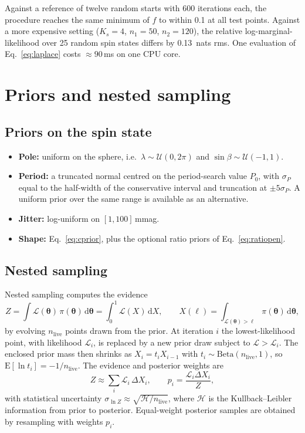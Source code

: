 \documentclass[11pt,a4paper]{article}
\theoremstyle{remark}
\newcommand{\vect}[1]{\bm{#1}}
\newcommand{\dd}{\,\mathrm{d}}
\begin{document}
Against a reference of twelve random starts with 600 iterations each, the procedure reaches the same
minimum of $f$ to within 0.1 at all test points. Against a more expensive setting ($K_s=4$, $n_1=50$,
$n_2=120$), the relative log-marginal-likelihood over 25 random spin states differs by 0.13~nats rms.
One evaluation of Eq.~\eqref{eq:laplace} costs $\approx90$\,ms on one CPU core.

\section{Priors and nested sampling}
\label{sec:nested}

\subsection{Priors on the spin state}
\label{sec:priors}
\begin{itemize}[nosep]
\item \textbf{Pole:} uniform on the sphere, i.e.\ $\lambda\sim\mathcal U(0,2\pi)$ and
  $\sin\beta\sim\mathcal U(-1,1)$.
\item \textbf{Period:} a truncated normal centred on the period-search value $P_0$, with $\sigma_P$
  equal to the half-width of the conservative interval and truncation at $\pm5\sigma_P$. A uniform
  prior over the same range is available as an alternative.
\item \textbf{Jitter:} log-uniform on $[1,100]$\,mmag.
\item \textbf{Shape:} Eq.~\eqref{eq:cprior}, plus the optional ratio priors of Eq.~\eqref{eq:ratiopen}.
\end{itemize}

\subsection{Nested sampling}
Nested sampling \citep{skilling2006} computes the evidence
\begin{equation}
  Z=\int\mathcal L(\vect\theta)\,\pi(\vect\theta)\dd\vect\theta=\int_0^1\mathcal L(X)\dd X,\qquad
  X(\ell)=\int_{\mathcal L(\vect\theta)>\ell}\pi(\vect\theta)\dd\vect\theta,
\end{equation}
by evolving $n_{\mathrm{live}}$ points drawn from the prior. At iteration $i$ the lowest-likelihood
point, with likelihood $\mathcal L_i$, is replaced by a new prior draw subject to
$\mathcal L>\mathcal L_i$. The enclosed prior mass then shrinks as $X_i=t_iX_{i-1}$ with
$t_i\sim\mathrm{Beta}(n_{\mathrm{live}},1)$, so $\mathrm E[\ln t_i]=-1/n_{\mathrm{live}}$. The evidence
and posterior weights are
\begin{equation}
  Z\approx\sum_i \mathcal L_i\,\Delta X_i,\qquad p_i=\frac{\mathcal L_i\Delta X_i}{Z},
\end{equation}
with statistical uncertainty $\sigma_{\ln Z}\approx\sqrt{\mathcal H/n_{\mathrm{live}}}$, where
$\mathcal H$ is the Kullback--Leibler information from prior to posterior. Equal-weight posterior
samples are obtained by resampling with weights $p_i$.
\end{document}
